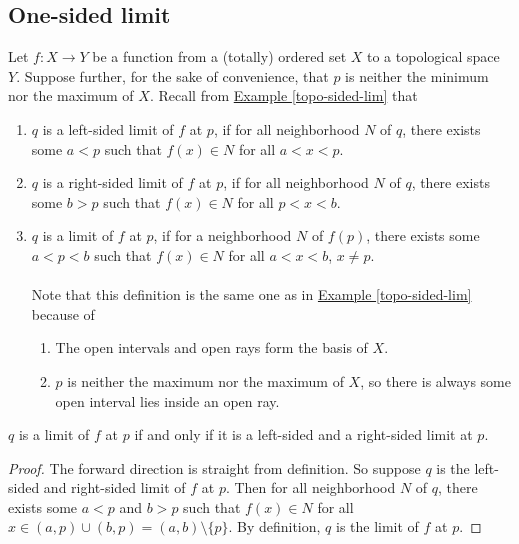 \documentclass{treatise}
\begin{document}
\subsection{One-sided limit}
Let $f: X \to Y$ be a function from a (totally) ordered set $X$ to a topological space $Y$. Suppose further, for the sake of convenience, that $p$ is neither the minimum nor the maximum of $X$. Recall from \hyperref[topo-sided-lim]{Example \ref*{topo-sided-lim}} that
\begin{enumerate}
    \item $q$ is a left-sided limit of $f$ at $p$, if for all neighborhood $N$ of $q$, there exists some $a < p$ such that $f(x) \in N$ for all $a < x < p$.
    \item $q$ is a right-sided limit of $f$ at $p$, if for all neighborhood $N$ of $q$, there exists some $b > p$ such that $f(x) \in N$ for all $p < x < b$.
    \item $q$ is a limit of $f$ at $p$, if for a neighborhood $N$ of $f(p)$, there exists some $a < p < b$ such that $f(x) \in N$ for all $a < x < b$, $x \neq p$.
    \\
    \\
    Note that this definition is the same one as in \hyperref[topo-sided-lim]{Example \ref*{topo-sided-lim}} because of
    \begin{enumerate}
        \item The open intervals and open rays form the basis of $X$.
        \item $p$ is neither the maximum nor the maximum of $X$, so there is always some open interval lies inside an open ray.
    \end{enumerate}
\end{enumerate}
\begin{proposition}
$q$ is a limit of $f$ at $p$ if and only if it is a left-sided and a right-sided limit at $p$.
\end{proposition}
\begin{proof}
The forward direction is straight from definition. So suppose $q$ is the left-sided and right-sided limit of $f$ at $p$. Then for all neighborhood $N$ of $q$, there exists some $a < p$ and $b > p$ such that $f(x) \in N$ for all $x \in (a, p) \cup (b, p) = (a, b) \setminus \{ p \}$. By definition, $q$ is the limit of $f$ at $p$.
\end{proof}
\end{document}
